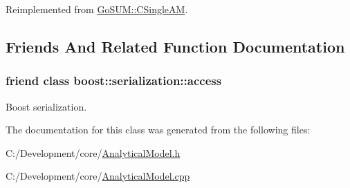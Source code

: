 Reimplemented from \hyperlink{class_go_s_u_m_1_1_c_single_a_m_a761e514fefeb7324e5509571f1be3848}{Go\-S\-U\-M\-::\-C\-Single\-A\-M}.



\subsection{Friends And Related Function Documentation}
\hypertarget{class_go_s_u_m_1_1_c_eps_svr_s_a_m_ac98d07dd8f7b70e16ccb9a01abf56b9c}{
\subsubsection[{boost\-::serialization\-::access}]{\setlength{\rightskip}{0pt plus 5cm}friend class boost\-::serialization\-::access\hspace{0.3cm}{\ttfamily [friend]}}}\label{class_go_s_u_m_1_1_c_eps_svr_s_a_m_ac98d07dd8f7b70e16ccb9a01abf56b9c}


Boost serialization. 



The documentation for this class was generated from the following files\-:\begin{DoxyCompactItemize}
\item 
C\-:/\-Development/core/\hyperlink{_analytical_model_8h}{Analytical\-Model.\-h}\item 
C\-:/\-Development/core/\hyperlink{_analytical_model_8cpp}{Analytical\-Model.\-cpp}\end{DoxyCompactItemize}
